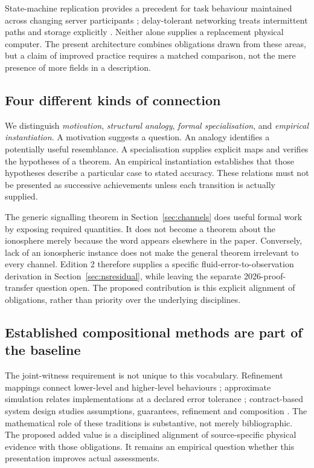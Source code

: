 \documentclass[11pt,a4paper]{article}
\theoremstyle{definition}
\theoremstyle{remark}
\begin{document}
State-machine replication provides a precedent for task behaviour maintained across changing server participants \citep{schneider}; delay-tolerant networking treats intermittent paths and storage explicitly \citep{dtn}. Neither alone supplies a replacement physical computer. The present architecture combines obligations drawn from these areas, but a claim of improved practice requires a matched comparison, not the mere presence of more fields in a description.

\subsection{Four different kinds of connection}
We distinguish \emph{motivation}, \emph{structural analogy}, \emph{formal specialisation}, and \emph{empirical instantiation}. A motivation suggests a question. An analogy identifies a potentially useful resemblance. A specialisation supplies explicit maps and verifies the hypotheses of a theorem. An empirical instantiation establishes that those hypotheses describe a particular case to stated accuracy. These relations must not be presented as successive achievements unless each transition is actually supplied.

The generic signalling theorem in Section~\ref{sec:channels} does useful formal work by exposing required quantities. It does not become a theorem about the ionosphere merely because the word appears elsewhere in the paper. Conversely, lack of an ionospheric instance does not make the general theorem irrelevant to every channel. Edition 2 therefore supplies a specific fluid-error-to-observation derivation in Section~\ref{sec:nsresidual}, while leaving the separate 2026-proof-transfer question open. The proposed contribution is this explicit alignment of obligations, rather than priority over the underlying disciplines.

\subsection{Established compositional methods are part of the baseline}
The joint-witness requirement is not unique to this vocabulary. Refinement mappings connect lower-level and higher-level behaviours \citep{abadi}; approximate simulation relates implementations at a declared error tolerance \citep{girard}; contract-based system design studies assumptions, guarantees, refinement and composition \citep{contracts}. The mathematical role of these traditions is substantive, not merely bibliographic. The proposed added value is a disciplined alignment of source-specific physical evidence with those obligations. It remains an empirical question whether this presentation improves actual assessments.
\end{document}

